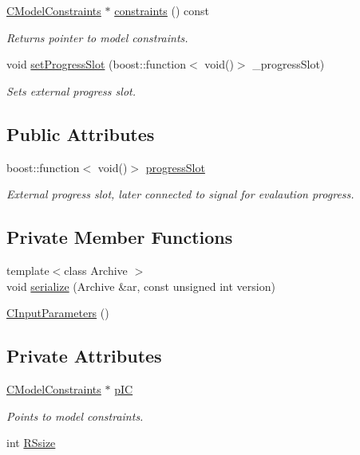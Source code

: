 \begin{DoxyCompactItemize}
\hyperlink{class_go_s_u_m_1_1_c_model_constraints}{C\-Model\-Constraints} $\ast$ \hyperlink{class_go_s_u_m_1_1_c_input_parameters_af672bb23aae739eb3030bd25dcacc082}{constraints} () const 
\begin{DoxyCompactList}\small\item\em Returns pointer to model constraints. \end{DoxyCompactList}\item 
void \hyperlink{class_go_s_u_m_1_1_c_input_parameters_a13ef77936322f7adce5f44ce2793fc42}{set\-Progress\-Slot} (boost\-::function$<$ void()$>$ \-\_\-progress\-Slot)
\begin{DoxyCompactList}\small\item\em Sets external progress slot. \end{DoxyCompactList}\end{DoxyCompactItemize}
\subsection*{Public Attributes}
\begin{DoxyCompactItemize}
\item 
boost\-::function$<$ void()$>$ \hyperlink{class_go_s_u_m_1_1_c_input_parameters_a7b08f28eae560f682cacb13647cd75ac}{progress\-Slot}
\begin{DoxyCompactList}\small\item\em External progress slot, later connected to signal for evalaution progress. \end{DoxyCompactList}\end{DoxyCompactItemize}
\subsection*{Private Member Functions}
\begin{DoxyCompactItemize}
\item 
{\footnotesize template$<$class Archive $>$ }\\void \hyperlink{class_go_s_u_m_1_1_c_input_parameters_aeb3b6421966bee3d7d38dc6df3a17ee3}{serialize} (Archive \&ar, const unsigned int version)
\item 
\hyperlink{class_go_s_u_m_1_1_c_input_parameters_a8708f612809710de0aa03dc062249c30}{C\-Input\-Parameters} ()
\end{DoxyCompactItemize}
\subsection*{Private Attributes}
\begin{DoxyCompactItemize}
\item 
\hyperlink{class_go_s_u_m_1_1_c_model_constraints}{C\-Model\-Constraints} $\ast$ \hyperlink{class_go_s_u_m_1_1_c_input_parameters_a6ea7a2d7d1ceb033321890c5313a6595}{p\-I\-C}
\begin{DoxyCompactList}\small\item\em Points to model constraints. \end{DoxyCompactList}\item 
int \hyperlink{class_go_s_u_m_1_1_c_input_parameters_ad33f3fe5498287609093ca480c221458}{R\-Ssize}
\end{DoxyCompactItemize}
